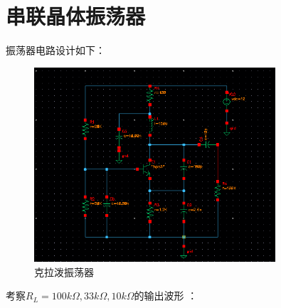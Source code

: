 \documentclass[12pt, a4paper]{article}
\begin{document}
    \section{串联晶体振荡器}
    振荡器电路设计如下：
    \begin{figure}[H]
    	\centering
    	\includegraphics[width = 0.8\textwidth]{crys-circ}
    	\caption{克拉泼振荡器}
    \end{figure}\par
    考察$R_L = 100k\Omega, 33k\Omega, 10k\Omega$的输出波形 ：
\end{document}
